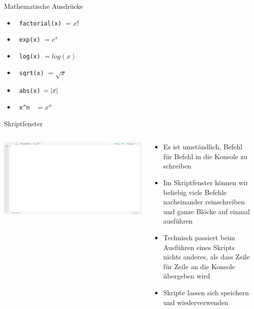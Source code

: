 \documentclass[xcolor=dvipsnames, aspectratio = 169]{beamer}
\begin{document}
\begin{frame}[fragile]{Mathematische Ausdrücke}
	\begin{itemize}
		\item \verb+ factorial(x)+ $= x!$
		\item \verb+ exp(x)+ $=e^x$
		\item \verb+ log(x)+ $=log(x)$
		\item \verb+ sqrt(x)+ $=\sqrt{x}$
		\item \verb+ abs(x)+ $=\left\lvert x \right\rvert$
		\item \verb+ x^n + $=x^n$
	\end{itemize}
\end{frame}

\begin{frame}{Skriptfenster}
	\begin{columns}[T]
	\begin{column}{0.6\textwidth}
	\includegraphics[width=\textwidth]{Rstudio_interface_i}
	\end{column}
	\begin{column}{0.4\textwidth}
	\begin{itemize}
		\item \small Es ist umständlich, Befehl für Befehl in die Konsole zu schreiben
		\item \small Im Skriptfenster können wir beliebig viele Befehle nacheinander reinschreiben und ganze Blöcke auf einmal ausführen
		\item \small Technisch passiert beim Ausführen eines Skripts nichts anderes, als dass Zeile für Zeile an die Konsole übergeben wird
		\item \small Skripte lassen sich speichern und wiederverwenden
	\end{itemize}
	\end{column}
\end{columns}
\end{frame}
\end{document}
